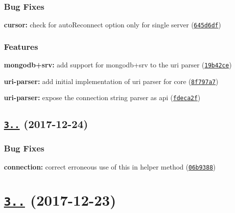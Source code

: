 \subsubsection*{Bug Fixes}


\begin{DoxyItemize}
\item {\bfseries cursor\+:} check for auto\+Reconnect option only for single server (\href{https://github.com/mongodb-js/mongodb-core/commit/645d6df}{\tt 645d6df})
\end{DoxyItemize}

\subsubsection*{Features}


\begin{DoxyItemize}
\item {\bfseries mongodb+srv\+:} add support for mongodb+srv to the uri parser (\href{https://github.com/mongodb-js/mongodb-core/commit/19b42ce}{\tt 19b42ce})
\item {\bfseries uri-\/parser\+:} add initial implementation of uri parser for core (\href{https://github.com/mongodb-js/mongodb-core/commit/8f797a7}{\tt 8f797a7})
\item {\bfseries uri-\/parser\+:} expose the connection string parser as api (\href{https://github.com/mongodb-js/mongodb-core/commit/fdeca2f}{\tt fdeca2f})
\end{DoxyItemize}

\label{_3.0.1}%
 \subsection*{\href{https://github.com/mongodb-js/mongodb-core/compare/v3.0.0...v3.0.1}{\tt 3..} (2017-\/12-\/24)}

\subsubsection*{Bug Fixes}


\begin{DoxyItemize}
\item {\bfseries connection\+:} correct erroneous use of {\ttfamily this} in helper method (\href{https://github.com/mongodb-js/mongodb-core/commit/06b9388}{\tt 06b9388})
\end{DoxyItemize}

\label{_3.0.0}%
 \section*{\href{https://github.com/christkv/mongodb-core/compare/v3.0.0-rc0...v3.0.0}{\tt 3..} (2017-\/12-\/23)}

